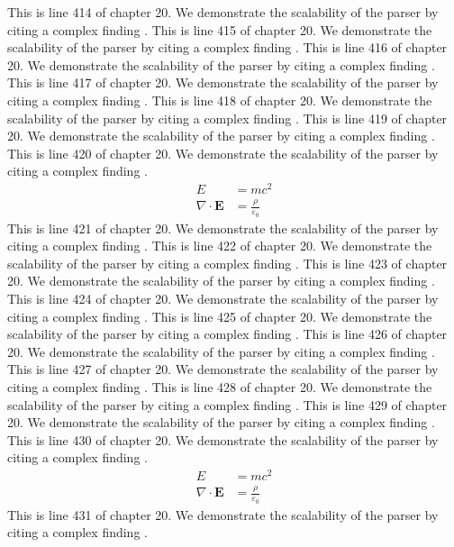 This is line 414 of chapter 20. We demonstrate the scalability of the parser by citing a complex finding \cite{ref20_414}.
This is line 415 of chapter 20. We demonstrate the scalability of the parser by citing a complex finding \cite{ref20_415}.
This is line 416 of chapter 20. We demonstrate the scalability of the parser by citing a complex finding \cite{ref20_416}.
This is line 417 of chapter 20. We demonstrate the scalability of the parser by citing a complex finding \cite{ref20_417}.
This is line 418 of chapter 20. We demonstrate the scalability of the parser by citing a complex finding \cite{ref20_418}.
This is line 419 of chapter 20. We demonstrate the scalability of the parser by citing a complex finding \cite{ref20_419}.
This is line 420 of chapter 20. We demonstrate the scalability of the parser by citing a complex finding \cite{ref20_420}.
\begin{align*}
  E &= mc^2 \\
  \nabla \cdot \mathbf{E} &= \frac{\rho}{\varepsilon_0}
\end{align*}
This is line 421 of chapter 20. We demonstrate the scalability of the parser by citing a complex finding \cite{ref20_421}.
This is line 422 of chapter 20. We demonstrate the scalability of the parser by citing a complex finding \cite{ref20_422}.
This is line 423 of chapter 20. We demonstrate the scalability of the parser by citing a complex finding \cite{ref20_423}.
This is line 424 of chapter 20. We demonstrate the scalability of the parser by citing a complex finding \cite{ref20_424}.
This is line 425 of chapter 20. We demonstrate the scalability of the parser by citing a complex finding \cite{ref20_425}.
This is line 426 of chapter 20. We demonstrate the scalability of the parser by citing a complex finding \cite{ref20_426}.
This is line 427 of chapter 20. We demonstrate the scalability of the parser by citing a complex finding \cite{ref20_427}.
This is line 428 of chapter 20. We demonstrate the scalability of the parser by citing a complex finding \cite{ref20_428}.
This is line 429 of chapter 20. We demonstrate the scalability of the parser by citing a complex finding \cite{ref20_429}.
This is line 430 of chapter 20. We demonstrate the scalability of the parser by citing a complex finding \cite{ref20_430}.
\begin{align*}
  E &= mc^2 \\
  \nabla \cdot \mathbf{E} &= \frac{\rho}{\varepsilon_0}
\end{align*}
This is line 431 of chapter 20. We demonstrate the scalability of the parser by citing a complex finding \cite{ref20_431}.
